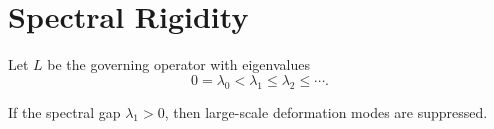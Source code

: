 \section{Spectral Rigidity}

Let \(L\) be the governing operator with eigenvalues
\[
0=\lambda_0 < \lambda_1 \le \lambda_2 \le \cdots .
\]

\begin{theorem}
If the spectral gap \(\lambda_1 > 0\), then large-scale deformation modes are suppressed.
\end{theorem}

